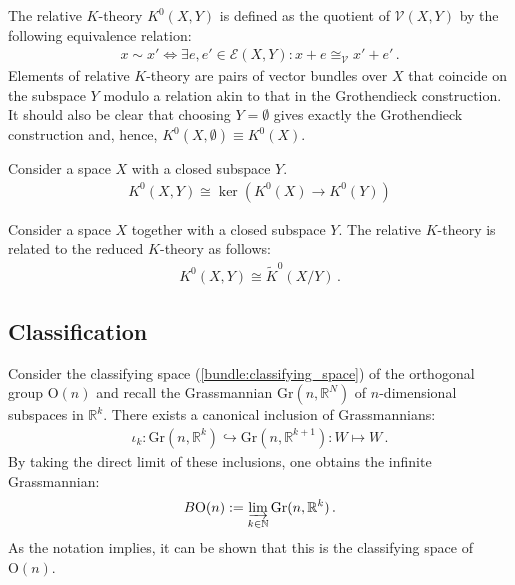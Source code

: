 {{        The relative $K$-theory $K^0(X,Y)$ is defined as the quotient of $\mathscr{V}(X,Y)$ by the following equivalence relation:
        \begin{gather}
            x\sim x' \iff \exists e,e'\in\mathscr{E}(X,Y):x+e\cong_{\mathscr{V}}x'+e'\,.
        \end{gather}
        Elements of relative $K$-theory are pairs of vector bundles over $X$ that coincide on the subspace $Y$ modulo a relation akin to that in the Grothendieck construction. It should also be clear that choosing $Y=\emptyset$ gives exactly the Grothendieck construction and, hence, $K^0(X,\emptyset)\equiv K^0(X)$.
    }
    \begin{property}
        Consider a space $X$ with a closed subspace $Y$.
        \begin{gather}
            K^0(X,Y)\cong\ker\left(K^0(X)\rightarrow K^0(Y)\right)
        \end{gather}
    \end{property}
    \begin{property}[Excision]\label{k:excision}
        Consider a space $X$ together with a closed subspace $Y$. The relative $K$-theory is related to the reduced $K$-theory as follows:
        \begin{gather}
            K^0(X,Y)\cong\widetilde{K}^0(X/Y)\,.
        \end{gather}
    \end{property}

\subsection{Classification}

    \begin{property}
        Consider the classifying space (\cref{bundle:classifying_space}) of the orthogonal group $\mathrm{O}(n)$ and recall the Grassmannian $\mathrm{Gr}(n,\mathbb{R}^N)$ of $n$-dimensional subspaces in $\mathbb{R}^k$. There exists a canonical inclusion of Grassmannians:
        \begin{gather}
            \iota_k:\mathrm{Gr}(n,\mathbb{R}^k)\hookrightarrow\mathrm{Gr}(n,\mathbb{R}^{k+1}):W\mapsto W\,.
        \end{gather}
        By taking the direct limit of these inclusions, one obtains the infinite Grassmannian:
        \begin{gather}
            B\mathrm{O}(n) := \varinjlim_{k\in\mathbb{N}}\mathrm{Gr}(n,\mathbb{R}^k)\,.
        \end{gather}
        As the notation implies, it can be shown that this is the classifying space of $\mathrm{O}(n)$.


\end{property}}
